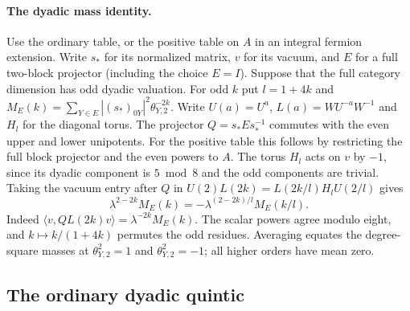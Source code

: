 \documentclass[11pt,a4paper]{article}
\numberwithin{equation}{section}
\begin{document}
\paragraph{The dyadic mass identity.}
Use the ordinary table, or the positive table on $A$ in an integral fermion
extension. Write $s_*$ for its normalized matrix, $v$ for its vacuum, and
$E$ for a full two-block projector (including the choice $E=I$).
Suppose that the full category dimension has odd dyadic valuation. For odd $k$ put
$l=1+4k$ and $M_E(k)=\sum_{Y\in E}|(s_*)_{0Y}|^2\theta_{Y,2}^{-2k}$.
Write $U(a)=U^a$, $L(a)=W U^{-a}W^{-1}$ and $H_l$ for the diagonal torus.
The projector $Q=s_* E s_*^{-1}$ commutes with the even upper and lower
unipotents. For the positive table this follows by restricting the full
block projector and the even powers to $A$. The torus $H_l$ acts on $v$
by $-1$, since its dyadic component is $5\bmod8$ and the odd components
are trivial. Taking the vacuum entry after $Q$ in
$U(2)L(2k)=L(2k/l)H_lU(2/l)$ gives
\begin{equation}\label{red:dyadic-mass-unified}
 \lambda^{2-2k}M_E(k)=-\lambda^{(2-2k)/l}M_E(k/l).
\end{equation}
Indeed $\langle v,Q L(2k)v\rangle=\lambda^{-2k}M_E(k)$.
The scalar powers agree modulo eight, and $k\mapsto k/(1+4k)$ permutes
the odd residues. Averaging equates the degree-square masses at
$\theta_{Y,2}^2=1$ and $\theta_{Y,2}^2=-1$; all higher orders have mean zero.

\subsection{The ordinary dyadic quintic}
\end{document}
